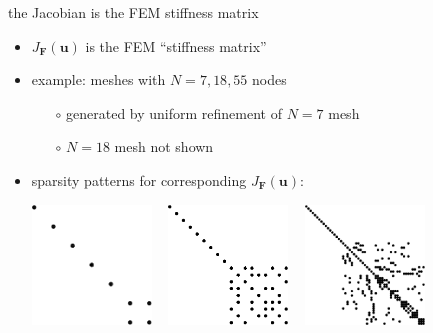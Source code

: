 \documentclass[hide notes,intlimits,usenames,dvipsnames]{beamer}
\newcommand{\bF}{\mathbf{F}}
\newcommand{\bu}{\mathbf{u}}
\begin{document}
\begin{frame}{the Jacobian is the FEM stiffness matrix}
\begin{itemize}
\item $J_\bF(\bu)$ is the FEM ``stiffness matrix''
\item example: meshes with $N=7,18,55$ nodes

\bigskip
 \hfill 

\vspace{-2mm}
    \begin{itemize}
    \item[$\circ$] generated by uniform refinement of $N=7$ mesh
    \item[$\circ$] $N=18$ mesh not shown
    \end{itemize}
\item sparsity patterns for corresponding $J_\bF(\bu)$:

\bigskip\bigskip
\mbox{\includegraphics[width=0.25\textwidth]{trap1mat} \, \includegraphics[width=0.25\textwidth]{trap2mat} \, \includegraphics[width=0.25\textwidth]{trapsmat}}

\medskip
\end{itemize}
\end{frame}
\end{document}
